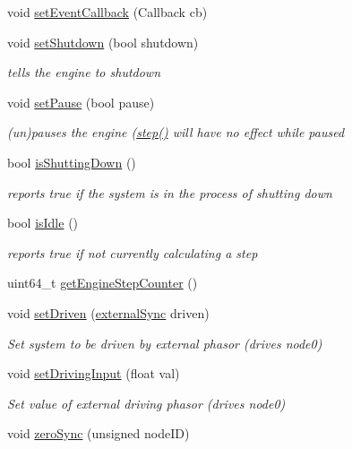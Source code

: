 \begin{DoxyCompactItemize}
void \hyperlink{classMatsuokaEngine_acaa099b8d5f49430d0fc84c16e0f4e67}{set\+Event\+Callback} (Callback cb)
\item 
void \hyperlink{classMatsuokaEngine_afca77a2464c5852a0dbb9eed2d191ecb}{set\+Shutdown} (bool shutdown)
\begin{DoxyCompactList}\small\item\em tells the engine to shutdown \end{DoxyCompactList}\item 
void \hyperlink{classMatsuokaEngine_a929ade3a9ce6497e47183190255cbfae}{set\+Pause} (bool pause)
\begin{DoxyCompactList}\small\item\em (un)pauses the engine (\hyperlink{classMatsuokaEngine_a4fa468dc0814f1ad92594f7a4d5abd00}{step()} will have no effect while paused \end{DoxyCompactList}\item 
bool \hyperlink{classMatsuokaEngine_a5d7bb7f68eb7338a6c34eef10d421f68}{is\+Shutting\+Down} ()
\begin{DoxyCompactList}\small\item\em reports true if the system is in the process of shutting down \end{DoxyCompactList}\item 
bool \hyperlink{classMatsuokaEngine_a1b6e6f86762e4541854b4262eb217f7e}{is\+Idle} ()
\begin{DoxyCompactList}\small\item\em reports true if not currently calculating a step \end{DoxyCompactList}\item 
uint64\+\_\+t \hyperlink{classMatsuokaEngine_a40114e7866da03ae1b7f37bcbde09876}{get\+Engine\+Step\+Counter} ()
\item 
void \hyperlink{classMatsuokaEngine_a738106afa4c313de36150a9687700193}{set\+Driven} (\hyperlink{classMatsuokaEngine_ad8f471b2f1ca479174d5514b9a3597ec}{external\+Sync} driven)
\begin{DoxyCompactList}\small\item\em Set system to be driven by external phasor (drives node0) \end{DoxyCompactList}\item 
void \hyperlink{classMatsuokaEngine_a08b0d367297310a788461e3610e80623}{set\+Driving\+Input} (float val)
\begin{DoxyCompactList}\small\item\em Set value of external driving phasor (drives node0) \end{DoxyCompactList}\item 
void \hyperlink{classMatsuokaEngine_a9ecbc93a17a602d8358c189363397575}{zero\+Sync} (unsigned node\+ID)
\end{DoxyCompactItemize}


